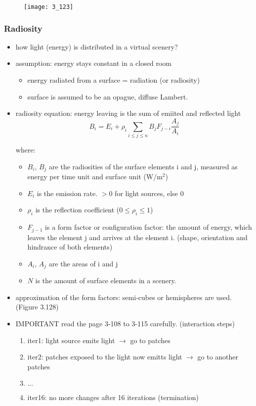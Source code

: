 \documentclass{standalone}
\begin{document}
\begin{figure}[H]
	\centering
	\texttt{[image: 3\_123]}
\end{figure}


\setcounter{subsubsection}{4}
\subsubsection{Radiosity}

\begin{itemize}
	\item how light (energy) is distributed in a virtual scenery?
	\item assumption: energy stays constant in a closed room 
		\begin{itemize}
			\item energy radiated from a surface = radiation (or radiosity)
			\item surface is assumed to be an opague, diffuse Lambert. 
		\end{itemize}
	\item radiosity equation: energy leaving is the sum of emiited and reflected light
		\begin{equation}
			B_i = E_i + \rho_i \sum_{i \leq j \leq n} B_j F_{j-i} \frac{A_j}{A_i}
		\end{equation}
		
		where:
		
		\begin{itemize}
			\item $B_i$, $B_j$ are the radiosities of the surface elements i and j, measured as energy per time unit and surface unit (W/m$^2$)
			\item $E_i$ is the emission rate. $> 0$ for light sources, else $0$
			\item $\rho_i$ is the reflection coefficient ($0 \leq \rho_i \leq 1$)
			\item $F_{j-1}$ is a form factor or configuration factor: the amount of energy, which leaves the element j and arrives at the element i. (shape, orientation and hindrance of both elements)
			\item $A_i$, $A_j$ are the areas of i and j
			\item $N$ is the amount of surface elements in a scenery.
		\end{itemize}
	\item approximation of the form factors: semi-cubes or hemispheres are used. (Figure 3.128)
	\item IMPORTANT read the page 3-108 to 3-115 carefully. (interaction steps)
		\begin{enumerate}
			\item iter1: light source emits light $\rightarrow$ go to patches
			\item iter2: patches exposed to the light now emitts light $\rightarrow$ go to another patches
			\item $\dots$
			\item iter16: no more changes after 16 iterations (termination)
		\end{enumerate}
		

\end{itemize}
\end{document}
